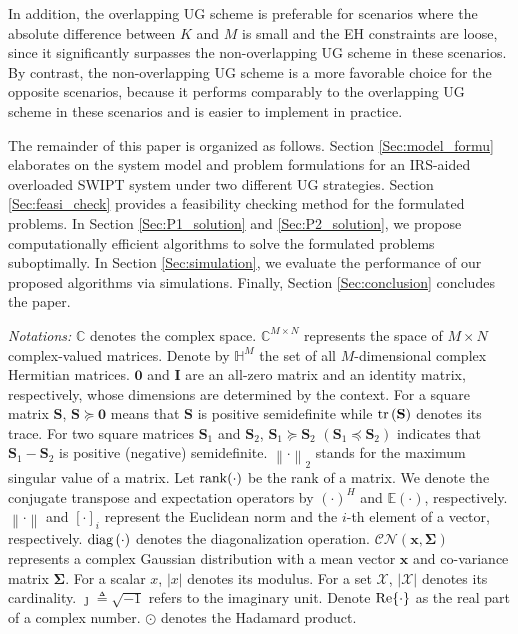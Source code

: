 \documentclass[12pt,draftclsnofoot, onecolumn]{IEEEtran}
\theoremstyle{plain}
\begin{document}
\begin{sloppypar}
\begin{itemize}
	In addition, the overlapping UG scheme is  preferable for scenarios where the absolute difference between $K$ and $M$ is small and the EH constraints are loose, since it significantly surpasses the non-overlapping UG scheme in these scenarios. By contrast, the non-overlapping UG scheme is a more favorable choice for the opposite scenarios, because it performs comparably to the overlapping UG scheme in these scenarios and is easier to implement in practice.   
\end{itemize} 

The remainder of this paper is organized as follows. Section \ref{Sec:model_formu} elaborates on the system model and problem formulations for an IRS-aided overloaded SWIPT system under two different UG strategies. Section \ref{Sec:feasi_check} provides a feasibility checking method for the formulated problems. In Section \ref{Sec:P1_solution} and \ref{Sec:P2_solution}, we propose computationally efficient algorithms to solve the formulated problems suboptimally. In Section \ref{Sec:simulation}, we evaluate the performance of our proposed algorithms via simulations. Finally, Section \ref{Sec:conclusion} concludes the paper.  

\emph{Notations:} $\mathbb C$ denotes the complex space. $\mathbb C^{M\times N}$ represents the space of $M\times N$ complex-valued matrices. Denote by $\mathbb H^M$ the set of all $M$-dimensional complex Hermitian matrices. $\mathbf 0$ and $\mathbf I$ are an all-zero matrix and an identity matrix, respectively, whose dimensions are determined by the context. For a square matrix $\mathbf S$, $\mathbf S\succeq \mathbf 0$ means that $\mathbf S$ is positive semidefinite while ${\rm tr}\left(\mathbf S\right)$ denotes its trace. For two square matrices $\mathbf S_1$ and $\mathbf S_2$, $\mathbf S_1 \succeq \mathbf S_2$ $(\mathbf S_1 \preceq \mathbf S_2)$ indicates that $\mathbf S_1 - \mathbf S_2$ is positive (negative) semidefinite. $\left\|\cdot\right\|_2$ stands for the maximum
singular value of a matrix. Let ${\rm rank}(\cdot)$ be the rank of a matrix. We denote the conjugate transpose and expectation operators by $(\cdot)^H$ and $\mathbb E\left(\cdot\right)$, respectively. $\left\|\cdot\right\|$ and $[\cdot]_i$ represent the Euclidean norm and the $i$-th element of a vector, respectively. ${\rm diag}\left(\cdot\right)$ denotes the diagonalization operation. $\mathcal{CN}\left(\mathbf x,\mathbf \Sigma\right)$ represents a complex Gaussian distribution with a mean vector $\mathbf x$ and co-variance matrix $\mathbf \Sigma$. For a scalar $x$, $\left|x\right|$ denotes its modulus. For a set $\mathcal X$, $\left|\mathcal X\right|$ denotes its cardinality. $\jmath \triangleq \sqrt{-1}$ refers to the imaginary unit. Denote ${\rm Re}\{\cdot\}$ as the real part of a complex number. $\odot$ denotes the Hadamard product. 


\end{sloppypar}
\end{document}
